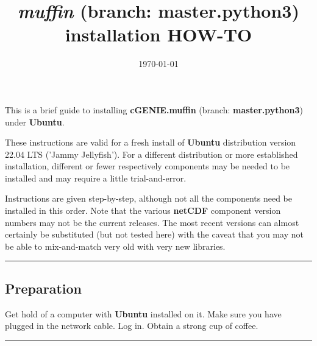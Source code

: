 \documentclass[10pt,twoside]{article}
\title{\textit{muffin} (branch: \textbf{master.python3}) installation HOW-TO\vspace{-8mm}}
\author{}
\date{\today}
\begin{document}

\maketitle


\noindent This is a brief guide to installing \textbf{cGENIE.muffin} (branch: \textbf{master.python3}) under \textbf{Ubuntu}. 

These instructions are valid for a fresh install of \textbf{Ubuntu} distribution version 22.04 LTS ('Jammy Jellyfish'). For a different distribution or more established installation, different or fewer respectively components may be needed to be installed and may require a little trial-and-error.

Instructions are given step-by-step, although not all the components need be installed in this order. Note that the various \textbf{netCDF} component version numbers may not be the current releases. The most recent versions can almost certainly be substituted (but not tested here) with the caveat that you may not be able to mix-and-match very old with very new libraries.

\vspace{1mm}\noindent\rule{4cm}{0.1mm}

\subsection{Preparation}
\vspace{1mm}

Get hold of a computer with \textbf{Ubuntu} installed on it. Make sure you have plugged in the network cable. Log in. Obtain a strong cup of coffee.

\vspace{1mm}\noindent\rule{4cm}{0.1mm}
\end{document}
